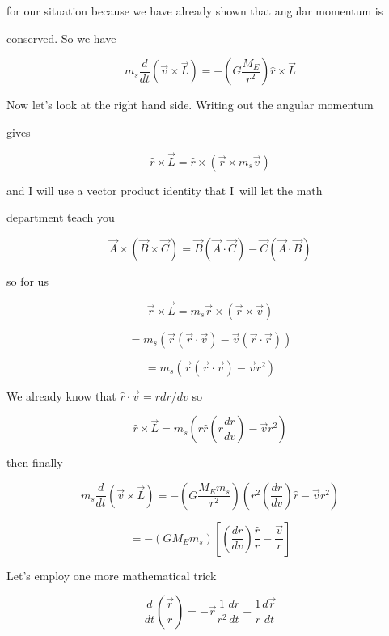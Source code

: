 for our situation because we have already shown that angular momentum is

conserved. So we have 

$$m_{s}\frac{d}{dt}\left( \overrightarrow{v}\times \overrightarrow{L}\right)=-\left( G\frac{M_{E}}{r^{2}}\right) \hat{r}\times \overrightarrow{L}$$


Now let's look at the right hand side. Writing out the angular momentum

gives 

$$\hat{r}\times \overrightarrow{L}=\hat{r}\times \left( \overrightarrow{r}\times m_{s}\overrightarrow{v}\right) $$

and I will use a vector product identity that I\ will let the math

department teach you

$$\overrightarrow{A}\times \left( \overrightarrow{B}\times \overrightarrow{C}\right) =\overrightarrow{B}\left( \overrightarrow{A}\cdot \overrightarrow{C}\right) -\overrightarrow{C}\left( \overrightarrow{A}\cdot \overrightarrow{B}\right) $$

so for us 

$$\overrightarrow{r}\times \overrightarrow{L}=m_{s}\overrightarrow{r}\times\left( \overrightarrow{r}\times \overrightarrow{v}\right) $$

$$=m_{s}\left( \overrightarrow{r}\left( \overrightarrow{r}\cdot \overrightarrow{v}\right) -\overrightarrow{v}\left( \overrightarrow{r}\cdot \overrightarrow{r}\right) \right) $$

$$=m_{s}\left( \overrightarrow{r}\left( \overrightarrow{r}\cdot \overrightarrow{v}\right) -\overrightarrow{v}r^{2}\right) $$


We already know that $\hat{r}\cdot \overrightarrow{v}=rdr/dv$ so 

$$\hat{r}\times \overrightarrow{L}=m_{s}\left( r\hat{r}\left( r\frac{dr}{dv}\right) -\overrightarrow{v}r^{2}\right) $$

then finally 

$$ m_{s}\frac{d}{dt}\left( \overrightarrow{v}\times \overrightarrow{L}\right)=-\left( G\frac{M_{E}m_{s}}{r^{2}}\right) \left( r^{2}\left( \frac{dr}{dv}\right) \hat{r}-\overrightarrow{v}r^{2}\right) 
$$

$$=-\left( GM_{E}m_{s}\right) \left[ \left( \frac{dr}{dv}\right) \frac{\hat{r}}{r}-\frac{\overrightarrow{v}}{r}\right] $$


Let's employ one more mathematical trick%

$$\frac{d}{dt}\left( \frac{\overrightarrow{r}}{r}\right) =-\overrightarrow{r} \frac{1}{r^{2}}\frac{dr}{dt}+\frac{1}{r}\frac{d\overrightarrow{r}}{dt}
$$

